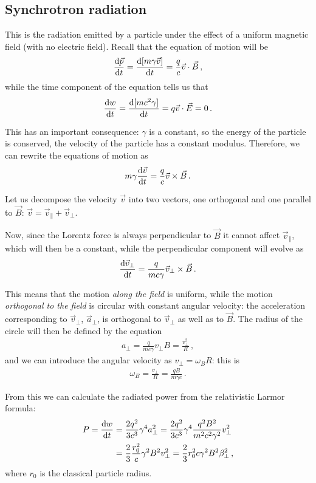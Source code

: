\documentclass[main.tex]{subfiles}
\begin{document}
\subsection{Synchrotron radiation}

This is the radiation emitted by a particle under the effect of a uniform magnetic field (with no electric field). 
Recall that the equation of motion will be 
%
\begin{align}
\dv{\vec{p}}{t} = \dv{[m \gamma \vec{v}]}{t} = \frac{q}{c} \vec{v} \cdot \vec{B}
\,,
\end{align}
%
while the time component of the equation tells us that 
%
\begin{align}
\dv{w}{t} = \dv{[m c^2 \gamma ]}{t} = q \vec{v} \cdot \vec{E}  =0 
\,.
\end{align}

This has an important consequence: \(\gamma \) is a constant, so the energy of the particle is conserved, the velocity of the particle has a constant modulus. Therefore, we can rewrite the equations of motion as 
%
\begin{align}
m \gamma \dv{\vec{v}}{t} = \frac{q}{c} \vec{v} \times \vec{B}
\,.
\end{align}

Let us decompose the velocity \(\vec{v}\) into two vectors, one orthogonal and one parallel to \(\vec{B}\): \(\vec{v} = \vec{v}_{\parallel} + \vec{v}_{\perp}\). 

Now, since the Lorentz force is always perpendicular to \(\vec{B}\) it cannot affect \(\vec{v}_\parallel\), which will then be a constant, while the perpendicular component will evolve as 
%
\begin{align}
\dv{\vec{v}_{\perp}}{t} = \frac{q}{mc \gamma } \vec{v}_{\perp} \times \vec{B}
\,.
\end{align}

This means that the motion \emph{along the field} is uniform, while the motion \emph{orthogonal to the field} is circular with constant angular velocity: the acceleration corresponding to \(\vec{v} _\perp\), \(\vec{a}_\perp\), is orthogonal to \(\vec{v}_\perp\) as well as to \(\vec{B}\).
The radius of the circle will then be defined by the equation 
%
\begin{align}
a_\perp = \frac{q}{mc \gamma } v_\perp B = \frac{v_\perp^2}{R}
\,,
\end{align}
%
and we can introduce the angular velocity as \(v_\perp = \omega _B R \): this is 
%
\begin{align}
\omega _B = \frac{v_\perp}{R} = \frac{qB}{m \gamma c}
\,.
\end{align}

From this we can calculate the radiated power from the relativistic Larmor formula: 
%
\begin{align}
P = \dv{w}{t} &= \frac{2 q^2}{3 c^3} \gamma^{4} a^2_\perp 
= \frac{2q^2}{3c^3} \gamma^{4} \frac{q^2B^2}{m^2c^2\gamma^2} v_\perp^2  \\
&= \frac{2}{3} \frac{r_0^2}{c} \gamma^2 B^2 v_\perp^2 
= \frac{2}{3} r_0^2 c \gamma^2 B^2 \beta_\perp^2
\,,
\end{align}
%
where \(r_0 \) is the classical particle radius. 
\end{document}
